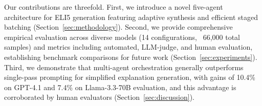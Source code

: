 Our contributions are threefold. First, we introduce a novel five-agent architecture for ELI5 generation featuring adaptive synthesis and efficient staged batching (Section~\ref{sec:methodology}). Second, we provide comprehensive empirical evaluation across diverse models (14 configurations, ~66,000 total samples) and metrics including automated, LLM-judge, and human evaluation, establishing benchmark comparisons for future work (Section~\ref{sec:experiments}). Third, we demonstrate that multi-agent orchestration generally outperforms single-pass prompting for simplified explanation generation, with gains of 10.4\% on GPT-4.1 and 7.4\% on Llama-3.3-70B evaluation, and this advantage is corroborated by human evaluators (Section~\ref{sec:discussion}).
